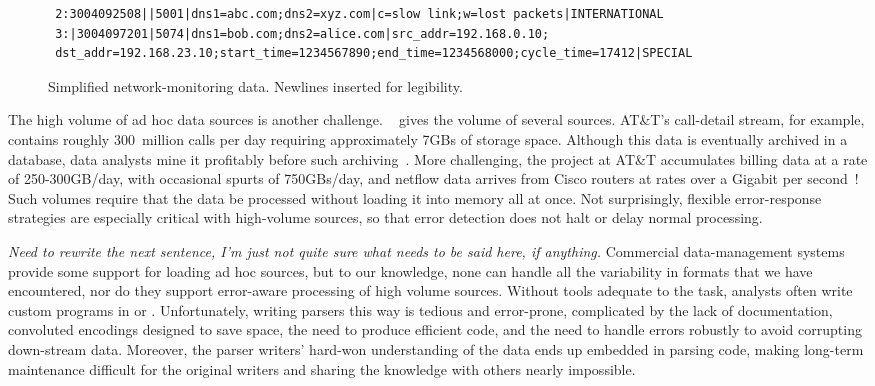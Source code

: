 \begin{figure*}
  \centering
  \small
\begin{verbatim}
 2:3004092508||5001|dns1=abc.com;dns2=xyz.com|c=slow link;w=lost packets|INTERNATIONAL
 3:|3004097201|5074|dns1=bob.com;dns2=alice.com|src_addr=192.168.0.10;
 dst_addr=192.168.23.10;start_time=1234567890;end_time=1234568000;cycle_time=17412|SPECIAL
\end{verbatim}  
  \caption{Simplified network-monitoring data. Newlines 
inserted for legibility.}
  \label{fig:darkstar-records1}
\end{figure*}






The high volume of ad hoc data sources is another challenge.
~ gives the volume of several sources.
AT\&T's call-detail stream, for example, contains roughly 300~million
calls per day requiring approximately 7GBs of storage space.  Although
this data is eventually archived in a database, data analysts mine it
profitably before such archiving~\cite{kdd98,kdd99}.  More
challenging, the \ningaui{} project at AT\&T accumulates billing data
at a rate of 250-300GB/day, with occasional spurts of 750GBs/day, and
netflow data arrives from Cisco routers at rates over a Gigabit per
second~\cite{gigascope}!  Such volumes require that the data be
processed without loading it into memory all at once.  Not
surprisingly, flexible error-response strategies are especially
critical with high-volume sources, so that error detection does not
halt or delay normal processing.


{\em Need to rewrite the next sentence, I'm just not quite sure what
  needs to be said here, if anything.}  Commercial data-management
systems provide some support for loading ad hoc sources, but to our
knowledge, none can handle all the variability in formats that we have
encountered, nor do they support error-aware processing of high volume
sources.  Without tools adequate to the task, analysts often write
custom programs in \C{} or \perl{}.  Unfortunately, writing parsers
this way is tedious and error-prone, complicated by the lack of
documentation, convoluted encodings designed to save space, the need
to produce efficient code, and the need to handle errors robustly to
avoid corrupting down-stream data.  Moreover, the parser writers'
hard-won understanding of the data ends up embedded in parsing code,
making long-term maintenance difficult for the original writers and
sharing the knowledge with others nearly impossible.

